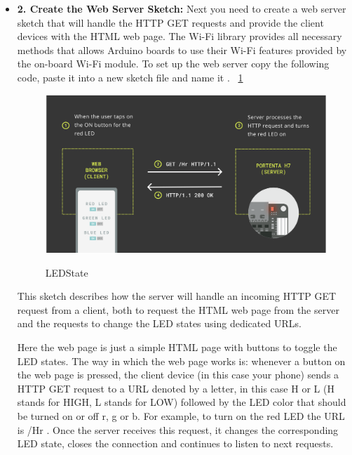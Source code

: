 \begin{itemize}
	\item \textbf{2. Create the Web Server Sketch:} Next you need to create a web server sketch that will handle the HTTP GET requests and provide the client devices with the HTML web page. The Wi-Fi library provides all necessary methods that allows Arduino boards to use their Wi-Fi features provided by the on-board Wi-Fi module. To set up the web server copy the following code, paste it into a new sketch file and name it . ~\ref{LEDState} \cite{portentaWifiAccessPoint:2024}
	

	\begin{figure}
		\begin{center}
			\includegraphics[width=0.7\linewidth]{Images/WIFI Module/LEDState.png}
			\caption{LEDState}
			\label{LEDState} \cite{portentaWifiAccessPoint:2024}
		\end{center}
	\end{figure}

	{
		\label{PortentaBLE}
	}
	
	This sketch describes how the server will handle an incoming HTTP GET request from a client, both to request the HTML web page from the server and the requests to change the LED states using dedicated URLs.
	
	Here the web page is just a simple HTML page with buttons to toggle the LED states. The way in which the web page works is: whenever a button on the web page is pressed, the client device (in this case your phone) sends a HTTP GET request to a URL denoted by a letter, in this case H or L (H stands for HIGH, L stands for LOW) followed by the LED color that should be turned on or off r, g or b. For example, to turn on the red LED the URL is /Hr . Once the server receives this request, it changes the corresponding LED state, closes the connection and continues to listen to next requests. \cite{portentaWifiAccessPoint:2024}
	

\end{itemize}
